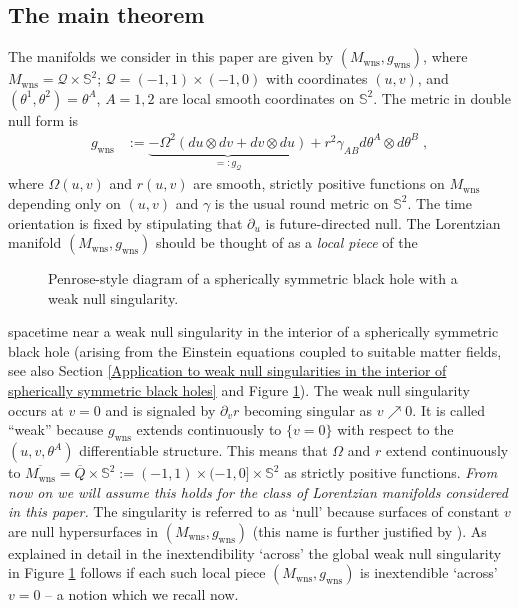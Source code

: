 \documentclass{article}
\newcommand{\Q}{\mathcal{Q}}
\newcommand{\Sp}{\mathbb{S}}
\newcommand{\Mw}{M_{\mathrm{wns}}}
\newcommand{\gw}{g_{\mathrm{wns}}}
\newcommand{\rd}{\partial}
\begin{document}
\subsection{The main theorem}

The manifolds we consider in this paper are given by $(\Mw,\gw)$, where $\Mw=\Q\times\Sp^2$; $\Q=(-1,1)\times(-1,0)$ with coordinates $(u, v)$, and $(\theta^1, \theta^2) = \theta^A$, $A=1,2$ are local smooth coordinates on $\Sp^2$. The metric in double null form is
\begin{equation} \label{EqGDN}
\begin{split}
    \gw&:=\underbrace{-\Omega^2(du \otimes dv + dv \otimes du)}_{=:g_\Q} + r^2\gamma_{AB}d\theta^A\otimes d\theta^B\;,
\end{split}
\end{equation}
where $\Omega(u,v)$ and $r(u,v)$ are smooth, strictly positive functions on $\Mw$ depending only on $(u,v)$ and $\gamma$ is the usual round metric on $\Sp^2$. The time orientation is fixed by stipulating that $\rd_u$ is future-directed null. The Lorentzian manifold $(\Mw, \gw)$ should be thought of as a \emph{local piece} of the 
\begin{figure}
 \centering
  \def\svgwidth{4cm}
    
   \caption{Penrose-style diagram of a spherically symmetric black hole with a weak null singularity.}
   \label{FigPen}
\end{figure}
spacetime near a weak null singularity in the interior of a spherically symmetric black hole (arising from the Einstein equations coupled to suitable matter fields, see also Section \ref{Application to  weak null singularities in the interior of spherically symmetric black holes} and Figure \ref{FigPen}). The weak null singularity occurs at $v=0$ and is signaled by $\rd_v r$ becoming singular as $v \nearrow 0$. 
It is called ``weak'' because $\gw$ extends continuously to $\{v=0\}$ with respect to the $(u,v,\theta^A)$ differentiable structure. This means that $\Omega$ and $r$ extend continuously to $\overline{\Mw}=\overline{Q}\times\Sp^2:=(-1,1)\times(-1,0]\times\Sp^2$ as strictly positive functions. \emph{From now on we will assume this holds for the class of Lorentzian manifolds considered in this paper.} The singularity is referred to as `null' because surfaces of constant $v$ are null hypersurfaces in $(\Mw,\gw)$ (this name is further justified by \cite[Proposition 3.2 (b)]{CameronSbierski}). 
As explained in detail in \cite[Section 2.1.1]{SbieLip} the inextendibility `across' the global weak null singularity in Figure \ref{FigPen} follows if each such local piece  $(\Mw, \gw)$ is inextendible `across' $v=0$ -- a notion which we recall now.
\end{document}
